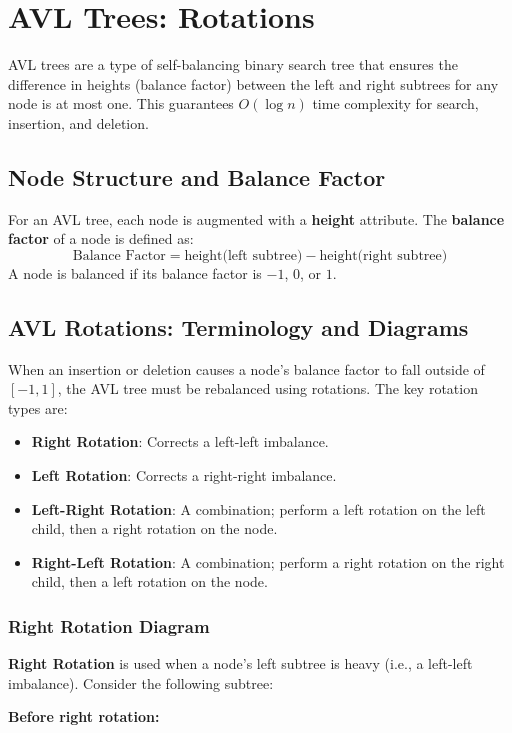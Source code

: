 \section{AVL Trees: Rotations}

AVL trees are a type of self-balancing binary search tree that ensures the difference in heights (balance factor) between the left and right subtrees for any node is at most one. This guarantees \( O(\log n) \) time complexity for search, insertion, and deletion.

\subsection{Node Structure and Balance Factor}
For an AVL tree, each node is augmented with a \textbf{height} attribute. The \textbf{balance factor} of a node is defined as:
\[
\text{Balance Factor} = \text{height(left subtree)} - \text{height(right subtree)}
\]
A node is balanced if its balance factor is \(-1\), \(0\), or \(1\).

\subsection{AVL Rotations: Terminology and Diagrams}
When an insertion or deletion causes a node's balance factor to fall outside of \([-1, 1]\), the AVL tree must be rebalanced using rotations. The key rotation types are:

\begin{itemize}
    \item \textbf{Right Rotation}: Corrects a left-left imbalance.
    \item \textbf{Left Rotation}: Corrects a right-right imbalance.
    \item \textbf{Left-Right Rotation}: A combination; perform a left rotation on the left child, then a right rotation on the node.
    \item \textbf{Right-Left Rotation}: A combination; perform a right rotation on the right child, then a left rotation on the node.
\end{itemize}

\subsubsection{Right Rotation Diagram}
\textbf{Right Rotation} is used when a node's left subtree is heavy (i.e., a left-left imbalance). Consider the following subtree:

\textbf{Before right rotation:}
\begin{center}
\end{center}


